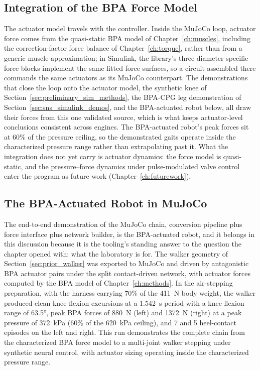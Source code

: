 \subsection{Integration of the BPA Force Model}\label{sec:sns_bpa_integration}

The actuator model travels with the controller. Inside the MuJoCo loop, actuator force comes from the quasi-static BPA model of Chapter~\ref{ch:muscles}, including the correction-factor force balance of Chapter~\ref{ch:torque}, rather than from a generic muscle approximation; in Simulink, the library's three diameter-specific force blocks implement the same fitted force surfaces, so a circuit assembled there commands the same actuators as its MuJoCo counterpart. The demonstrations that close the loop onto the actuator model, the synthetic knee of Section~\ref{sec:preliminary_sim_methods}, the BPA-CPG leg demonstration of Section~\ref{sec:sns_simulink_demos}, and the BPA-actuated robot below, all draw their forces from this one validated source, which is what keeps actuator-level conclusions consistent across engines. The BPA-actuated robot's peak forces sit at 60\% of the pressure ceiling, so the demonstrated gaits operate inside the characterized pressure range rather than extrapolating past it. What the integration does not yet carry is actuator dynamics: the force model is quasi-static, and the pressure--force dynamics under pulse-modulated valve control \citep{elzein_pressure_2025} enter the program as future work (Chapter~\ref{ch:futurework}).

\subsection{The BPA-Actuated Robot in MuJoCo}\label{sec:bpa_walker}

The end-to-end demonstration of the MuJoCo chain, conversion pipeline plus force interface plus network builder, is the BPA-actuated robot, and it belongs in this discussion because it is the tooling's standing answer to the question the chapter opened with: what the laboratory is for. The walker geometry of Section~\ref{sec:prior_walker} was exported to MuJoCo and driven by antagonistic BPA actuator pairs under the split contact-driven network, with actuator forces computed by the BPA model of Chapter~\ref{ch:methods}. In the air-stepping preparation, with the harness carrying 70\% of the \qty{411}{\N} body weight, the walker produced clean knee-flexion excursions at a \qty{1.542}{\second} period with a knee flexion range of \ang{63.5}, peak BPA forces of \qty{880}{\N} (left) and \qty{1372}{\N} (right) at a peak pressure of \qty{372}{\kPa} (60\% of the \qty{620}{\kPa} ceiling), and 7 and 5 heel-contact episodes on the left and right. This run demonstrates the complete chain from the characterized BPA force model to a multi-joint walker stepping under synthetic neural control, with actuator sizing operating inside the characterized pressure range.

